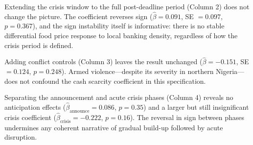 \documentclass[12pt]{article}
\begin{document}
Extending the crisis window to the full post-deadline period (Column 2) does not change the picture. The coefficient reverses sign ($\hat{\beta} = 0.091$, SE $= 0.097$, $p = 0.367$), and the sign instability itself is informative: there is no stable differential food price response to local banking density, regardless of how the crisis period is defined.

Adding conflict controls (Column 3) leaves the result unchanged ($\hat{\beta} = -0.151$, SE $= 0.124$, $p = 0.248$). Armed violence---despite its severity in northern Nigeria---does not confound the cash scarcity coefficient in this specification.

Separating the announcement and acute crisis phases (Column 4) reveals no anticipation effects ($\hat{\beta}_{\text{announce}} = 0.086$, $p = 0.35$) and a larger but still insignificant crisis coefficient ($\hat{\beta}_{\text{crisis}} = -0.222$, $p = 0.16$). The reversal in sign between phases undermines any coherent narrative of gradual build-up followed by acute disruption.
\end{document}

